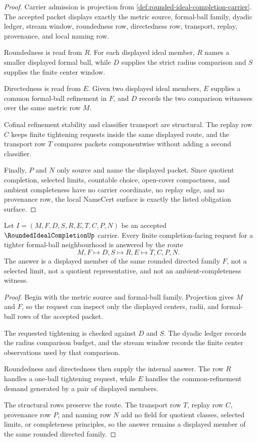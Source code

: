 \begin{proof}
Carrier admission is projection from \autoref{def:rounded-ideal-completion-carrier}. The accepted packet displays exactly the metric source, formal-ball family, dyadic ledger, stream window, roundedness row, directedness row, transport, replay, provenance, and local naming row.

Roundedness is read from $R$. For each displayed ideal member, $R$ names a smaller displayed formal ball, while $D$ supplies the strict radius comparison and $S$ supplies the finite center window.

Directedness is read from $E$. Given two displayed ideal members, $E$ supplies a common formal-ball refinement in $F$, and $D$ records the two comparison witnesses over the same metric row $M$.

Cofinal refinement stability and classifier transport are structural. The replay row $C$ keeps finite tightening requests inside the same displayed route, and the transport row $T$ compares packets componentwise without adding a second classifier.

Finally, $P$ and $N$ only source and name the displayed packet. Since quotient completion, selected limits, countable choice, open-cover compactness, and ambient completeness have no carrier coordinate, no replay edge, and no provenance row, the local NameCert surface is exactly the listed obligation surface.
\end{proof}

\begin{theorem}
\label{thm:rounded-ideal-completion-cofinal-replay}
Let $I=(M,F,D,S,R,E,T,C,P,N)$ be an accepted $\RoundedIdealCompletionUp$ carrier. Every finite completion-facing request for a tighter formal-ball neighbourhood is answered by the route
$$
M,F \longmapsto D,S \longmapsto R,E \longmapsto T,C,P,N .
$$
The answer is a displayed member of the same rounded directed family $F$, not a selected limit, not a quotient representative, and not an ambient-completeness witness.
\end{theorem}
\begin{proof}
Begin with the metric source and formal-ball family. Projection gives $M$ and $F$, so the request can inspect only the displayed centers, radii, and formal-ball rows of the accepted packet.

The requested tightening is checked against $D$ and $S$. The dyadic ledger records the radius comparison budget, and the stream window records the finite center observations used by that comparison.

Roundedness and directedness then supply the internal answer. The row $R$ handles a one-ball tightening request, while $E$ handles the common-refinement demand generated by a pair of displayed members.

The structural rows preserve the route. The transport row $T$, replay row $C$, provenance row $P$, and naming row $N$ add no field for quotient classes, selected limits, or completeness principles, so the answer remains a displayed member of the same rounded directed family.
\end{proof}

